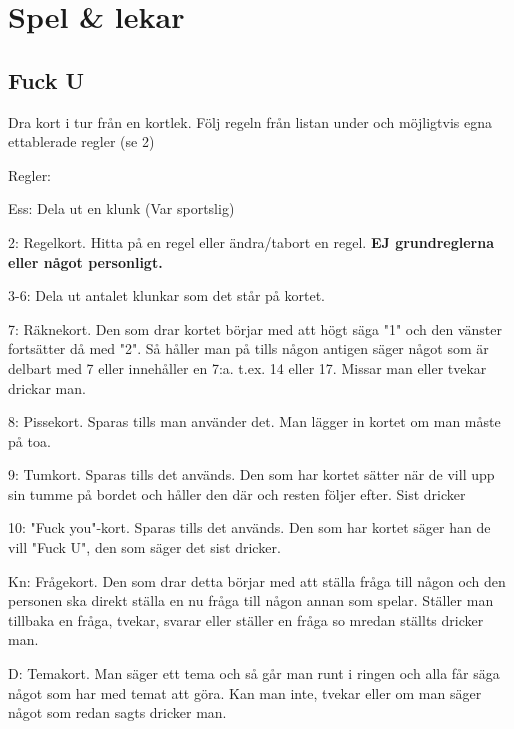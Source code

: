 
\section{Spel \& lekar}

\pagestyle{Spel & lekar}



\subsection*{\textbf{Fuck U}}


Dra kort i tur från en kortlek. Följ regeln från listan under 
och möjligtvis egna ettablerade regler (se 2)

Regler:

Ess: Dela ut en klunk (Var sportslig)

2: Regelkort. Hitta på en regel eller ändra/tabort en regel. \textbf{EJ grundreglerna eller något personligt.} 

3-6: Dela ut antalet klunkar som det står på kortet.

7: Räknekort. Den som drar kortet börjar med att högt säga "1" 
och den vänster fortsätter då med "2". 
Så håller man på tills någon antigen säger något som är 
delbart med 7 eller innehåller en 7:a. t.ex. 14 eller 17. 
Missar man eller tvekar drickar man.

8: Pissekort. Sparas tills man använder det. Man lägger in kortet om man måste på toa.

9: Tumkort. Sparas tills det används. 
Den som har kortet sätter när de vill upp sin tumme på bordet 
och håller den där och resten följer efter. 
Sist dricker

10: "Fuck you"-kort.
Sparas tills det används. Den som har kortet säger han de vill "Fuck U", den som säger det sist dricker.

Kn: Frågekort. Den som drar detta börjar med att ställa fråga till någon 
och den personen ska direkt ställa en nu fråga till någon 
annan som spelar. Ställer man tillbaka en fråga, tvekar, svarar 
eller ställer en fråga so mredan ställts dricker man.

D: Temakort. Man säger ett tema och så går man runt i
ringen och alla får säga något som har med temat att göra.
Kan man inte, tvekar eller om man säger något som redan sagts dricker man.

